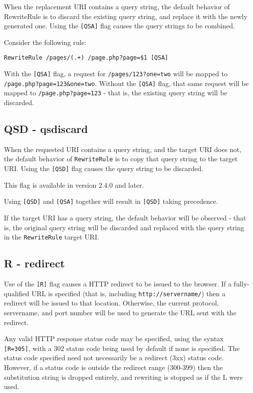 When the replacement URI contains a query string, the default behavior of RewriteRule is to discard the existing query string, and replace it with the newly generated one. Using the \verb~[QSA]~ flag causes the query strings to be combined.

Consider the following rule:

\begin{verbatim}
RewriteRule /pages/(.+) /page.php?page=$1 [QSA]
\end{verbatim}

With the \verb~[QSA]~ flag, a request for \verb~/pages/123?one=two~ will be mapped to \verb~/page.php?page=123&one=two~. Without the \verb~[QSA]~ flag, that same request will be mapped to \verb~/page.php?page=123~ - that is, the existing query string will be discarded.

\subsection{QSD - qsdiscard}
\label{qsdflag}


When the requested URI contains a query string, and the target URI does not, the default behavior of \verb~RewriteRule~ is to copy that query string to the target URI. Using the \verb~[QSD]~ flag causes the query string to be discarded.

This flag is available in version 2.4.0 and later.

Using \verb~[QSD]~ and \verb~[QSA]~ together will result in \verb~[QSD]~ taking precedence.

If the target URI has a query string, the default behavior will be observed - that is, the original query string will be discarded and replaced with the query string in the \verb~RewriteRule~ target URI.


\subsection{R - redirect}
\label{rflag}

Use of the \verb~[R]~ flag causes a HTTP redirect to be issued to the browser. If a fully-qualified URL is specified (that is, including \verb~http://servername/~) then a redirect will be issued to that location. Otherwise, the current protocol, servername, and port number will be used to generate the URL sent with the redirect.

Any valid HTTP response status code may be specified, using the syntax \verb~[R=305]~, with a 302 status code being used by default if none is specified. The status code specified need not necessarily be a redirect (3xx) status code. However, if a status code is outside the redirect range (300-399) then the substitution string is dropped entirely, and rewriting is stopped as if the L were used.

